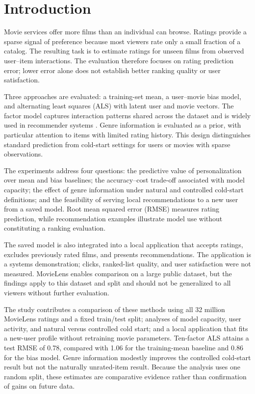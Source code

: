 \section{Introduction}
Movie services offer more films than an individual can browse. Ratings provide a sparse signal of preference because most viewers rate only a small fraction of a catalog. The resulting task is to estimate ratings for unseen films from observed user--item interactions. The evaluation therefore focuses on rating prediction error; lower error alone does not establish better ranking quality or user satisfaction.

Three approaches are evaluated: a training-set mean, a user--movie bias model, and alternating least squares (ALS) with latent user and movie vectors. The factor model captures interaction patterns shared across the dataset and is widely used in recommender systems \citep{koren2009}. Genre information is evaluated as a prior, with particular attention to items with limited rating history. This design distinguishes standard prediction from cold-start settings for users or movies with sparse observations.

The experiments address four questions: the predictive value of personalization over mean and bias baselines; the accuracy--cost trade-off associated with model capacity; the effect of genre information under natural and controlled cold-start definitions; and the feasibility of serving local recommendations to a new user from a saved model. Root mean squared error (RMSE) measures rating prediction, while recommendation examples illustrate model use without constituting a ranking evaluation.

The saved model is also integrated into a local application that accepts ratings, excludes previously rated films, and presents recommendations. The application is a systems demonstration; clicks, ranked-list quality, and user satisfaction were not measured. MovieLens enables comparison on a large public dataset, but the findings apply to this dataset and split and should not be generalized to all viewers without further evaluation.

The study contributes a comparison of these methods using all 32 million MovieLens ratings and a fixed train/test split; analyses of model capacity, user activity, and natural versus controlled cold start; and a local application that fits a new-user profile without retraining movie parameters. Ten-factor ALS attains a test RMSE of 0.78, compared with 1.06 for the training-mean baseline and 0.86 for the bias model. Genre information modestly improves the controlled cold-start result but not the naturally unrated-item result. Because the analysis uses one random split, these estimates are comparative evidence rather than confirmation of gains on future data.

